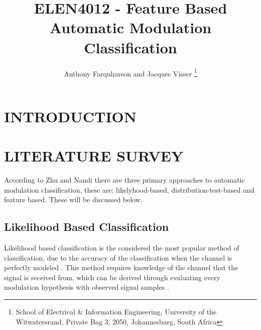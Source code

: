 \documentclass[10pt,twocolumn]{witseiepaper}
\begin{document}
\title{ELEN4012 - Feature Based Automatic Modulation Classification}

\author{Anthony Farquharson and Jacques Visser
\thanks{School of Electrical \& Information Engineering, University of the
Witwatersrand, Private Bag 3, 2050, Johannesburg, South Africa}
}



\maketitle
\thispagestyle{empty}\pagestyle{empty}

\section{INTRODUCTION}

\section{LITERATURE SURVEY}
\label{sec:literature}
According to Zhu and Nandi \cite{zhu2014automatic} there are three primary approaches to automatic modulation classification, these are: likelyhood-based, distribution-test-based and feature based. These will be discussed below.

	\subsection{Likelihood Based Classification}
	\label{subsec:likelyhood}
	Likelihood based classification is the considered the most popular method of classification, due to the accuracy of the classification when the channel is perfectly modeled \cite{zhu2014automatic}. This method requires knowledge of the channel that the signal is received from, which can be derived through evaluating every modulation hypothesis with observed signal samples \cite{zhu2014automatic}.\\[11pt]
\end{document}
